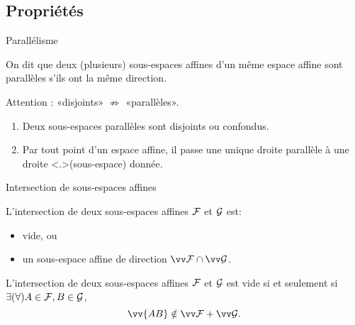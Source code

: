 \documentclass[bigger]{m53beamer}
\begin{document}
\subsection{Propriétés}
  \begin{frame}{Parallélisme}
    \begin{definition}
      On dit que deux (plusieurs) sous-espaces affines d'un même espace affine sont
      \alert{parallèles} s'ils ont la même direction.\pause{}
    \end{definition}\pause
    Attention : «disjoints» $\not\Rightarrow$ «parallèles».\pause
    \begin{proposition}
      \begin{enumerate}[<+->]
        \item Deux sous-espaces parallèles sont disjoints ou confondus.
        \item Par tout point d'un espace affine, il passe une unique droite \uncover<+>{(sous-espace)} parallèle à une droite  donnée.
      \end{enumerate}
    \end{proposition}
  \end{frame}
  \begin{frame}{Intersection de sous-espaces affines}
    \begin{proposition}
      L'intersection de deux sous-espaces affines $\mathcal{F}$ et $\mathcal{G}$ est:
      \begin{itemize}\pause
          \item vide\pause, ou
          \item un sous-espace affine de direction $\ev{F}\cap\ev{G}$.
        \end{itemize}
    \end{proposition}\pause
    \begin{proposition}
      L'intersection de deux sous-espaces affines $\mathcal{F}$ et $\mathcal{G}$ est vide si et seulement si $\exists(\forall) A \in \mathcal{F}, B \in \mathcal{G}$,
      $$
        \vv{AB} \notin \ev{F}+\ev{G}.
      $$
    \end{proposition}
  \end{frame}
\end{document}
